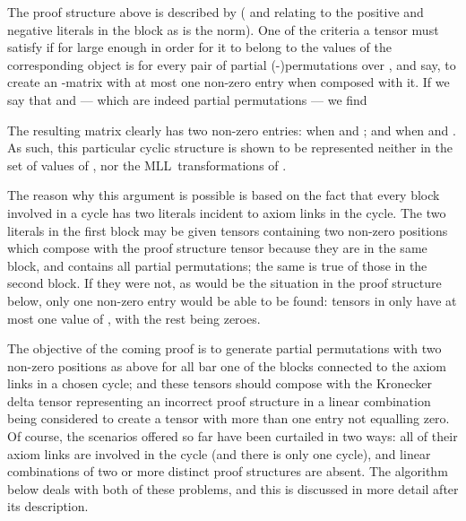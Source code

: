 \documentclass{LMCS}
\theoremstyle{plain}\newtheorem*{cLm}{Claim}
\newcommand{\mll}{MLL} \newcommand{\mall}{MALL}
\newcommand{\p}{} \newcommand{\N}{\mathbb{N}}
\begin{document}
The proof structure above is described by  ( and  relating to the positive and negative literals in the  block as is the norm). One of the criteria a tensor  must satisfy if  for large enough  in order for it to belong to the values of the corresponding object is for every pair of partial (-)permutations over ,  and  say, to create an -matrix with at most one non-zero entry when composed with it. If we say that  and  --- which are indeed partial permutations --- we find

The resulting matrix clearly has two non-zero entries: when  and ; and when  and . As such, this particular cyclic structure is shown to be represented neither in the set of values of , nor the \mll~transformations of .

\p The reason why this argument is possible is based on the fact that every block involved in a cycle has two literals incident to axiom links in the cycle. The two literals in the first block may be given tensors containing two non-zero positions which compose with the proof structure tensor because they are in the same block, and  contains all partial permutations; the same is true of those in the second block. If they were not, as would be the situation in the proof structure below, only one non-zero entry would be able to be found: tensors in  only have at most one value of , with the rest being zeroes.

\begin{center} \vspace{5mm}
 \vspace{2mm}
\end{center}

The objective of the coming proof is to generate partial permutations with two non-zero positions as above for all bar one of the blocks connected to the axiom links in a chosen cycle; and these tensors should compose with the Kronecker delta tensor representing an incorrect proof structure in a linear combination being considered to create a tensor with more than one entry not equalling zero. Of course, the scenarios offered so far have been curtailed in two ways: all of their axiom links are involved in the cycle (and there is only one cycle), and linear combinations of two or more distinct proof structures are absent. The algorithm below deals with both of these problems, and this is discussed in more detail after its description.
\end{document}
